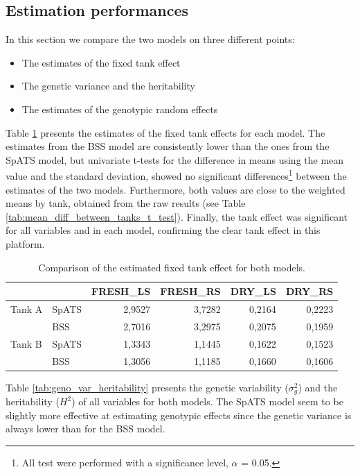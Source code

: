 \subsection{Estimation performances}
In this section we compare the two models on three different points:
\begin{itemize}
	\item The estimates of the fixed tank effect
	\item The genetic variance and the heritability
	\item The estimates of the genotypic random effects
\end{itemize}
Table \ref{tab:tank_effect_model_comparison} presents the estimates of the fixed tank effects for each model. The estimates from the BSS model are consistently lower than the ones from the SpATS model, but univariate t-tests for the difference in means using the mean value and the standard deviation, showed no significant differences\footnote{All test were performed with a significance level, $\alpha$ = 0.05.} between the estimates of the two models. Furthermore, both values are close to the weighted means by tank, obtained from the raw results (see Table \ref{tab:mean_diff_between_tanks_t_test}). Finally, the tank effect was significant for all variables and in each model, confirming the clear tank effect in this platform.\\

\begin{table}[htbp]
  \centering
  \caption{Comparison of the estimated fixed tank effect for both models.}
    \begin{tabular}{llrrrr}
    \toprule
          &       & \multicolumn{1}{l}{FRESH\_LS} & \multicolumn{1}{l}{FRESH\_RS} & \multicolumn{1}{l}{DRY\_LS} & \multicolumn{1}{l}{DRY\_RS} \\
    \midrule
    Tank A & SpATS & 2,9527 & 3,7282 & 0,2164 & 0,2223 \\
           & BSS   & 2,7016 & 3,2975 & 0,2075 & 0,1959 \\
    \midrule
    Tank B & SpATS & 1,3343 & 1,1445 & 0,1622 & 0,1523 \\
          & BSS   & 1,3056 & 1,1185 & 0,1660 & 0,1606 \\
    \bottomrule
    \end{tabular}%

  \label{tab:tank_effect_model_comparison}%
\end{table}%

Table \ref{tab:geno_var_heritability} presents the genetic variability ($\sigma^2_{g}$) and the heritability ($H^2$) of all variables for both models. The SpATS model seem to be slightly more effective at estimating genotypic effects since the genetic variance is always lower than for the BSS model.\\

